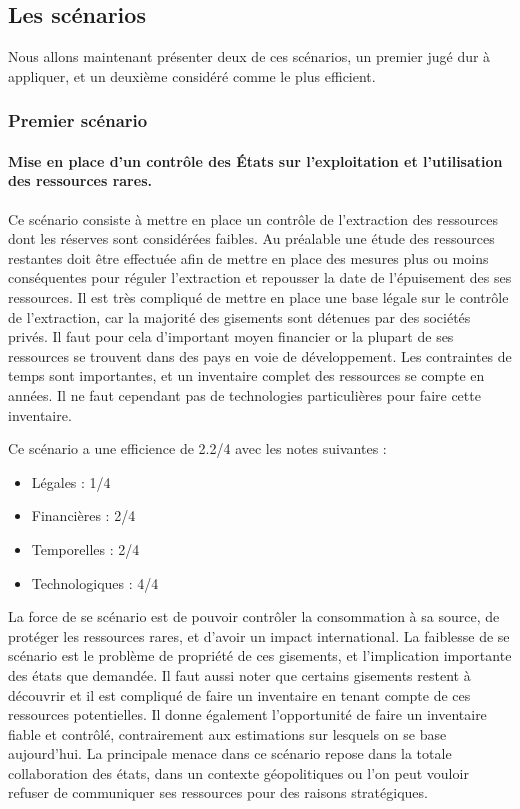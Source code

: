 \subsection{Les scénarios}

\smallbreak Nous allons maintenant présenter deux de ces scénarios, un premier jugé dur à appliquer, et un deuxième considéré comme le plus efficient.

\subsubsection{Premier scénario}    
\paragraph{Mise en place d’un contrôle des États sur l’exploitation et l’utilisation des ressources rares.}
\medbreak
Ce scénario consiste à mettre en place un contrôle de l’extraction des ressources dont les réserves sont considérées faibles. Au préalable une étude des ressources restantes doit être effectuée afin de mettre en place des mesures plus ou moins conséquentes pour réguler l’extraction et repousser la date de l’épuisement des ses ressources.
Il est très compliqué de mettre en place une base légale sur le contrôle de l’extraction, car la majorité des gisements sont détenues par des sociétés privés. 
Il faut pour cela d’important moyen financier or la plupart de ses ressources se trouvent dans des pays en voie de développement.
Les contraintes de temps sont importantes, et un inventaire complet des ressources se compte en années. 
Il ne faut cependant pas de technologies particulières pour faire cette inventaire.

Ce scénario a une efficience de 2.2/4 avec les notes suivantes :
\begin{itemize}
\item Légales : 1/4
\item Financières : 2/4
\item Temporelles : 2/4
\item Technologiques : 4/4
\end{itemize}



La force de se scénario est de pouvoir contrôler la consommation à sa source, de protéger les ressources rares, et d’avoir un impact international.
La faiblesse de se scénario est le problème de propriété de ces gisements, et l’implication importante des états que demandée. Il faut aussi noter que certains gisements restent à découvrir et il est compliqué de faire un inventaire en tenant compte de ces ressources potentielles.
Il donne également l’opportunité de faire un inventaire fiable et contrôlé, contrairement aux estimations sur lesquels on se base aujourd’hui.
\medbreak
La principale menace dans ce scénario repose dans la totale collaboration des états, dans un contexte géopolitiques ou l’on peut vouloir refuser de communiquer ses ressources pour des raisons stratégiques.


